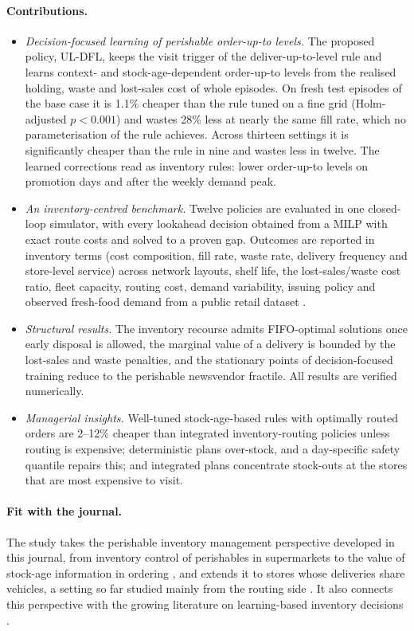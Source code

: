 \documentclass[11pt,a4paper]{article}
\begin{document}
\paragraph{Contributions.}
\begin{itemize}[leftmargin=*]
\item \emph{Decision-focused learning of perishable order-up-to levels.} The proposed policy, UL-DFL, keeps the visit trigger of the deliver-up-to-level rule and learns context- and stock-age-dependent order-up-to levels from the realised holding, waste and lost-sales cost of whole episodes. On fresh test episodes of the base case it is 1.1\% cheaper than the rule tuned on a fine grid (Holm-adjusted $p<0.001$) and wastes 28\% less at nearly the same fill rate, which no parameterisation of the rule achieves. Across thirteen settings it is significantly cheaper than the rule in nine and wastes less in twelve. The learned corrections read as inventory rules: lower order-up-to levels on promotion days and after the weekly demand peak.
\item \emph{An inventory-centred benchmark.} Twelve policies are evaluated in one closed-loop simulator, with every lookahead decision obtained from a MILP with exact route costs and solved to a proven gap. Outcomes are reported in inventory terms (cost composition, fill rate, waste rate, delivery frequency and store-level service) across network layouts, shelf life, the lost-sales/waste cost ratio, fleet capacity, routing cost, demand variability, issuing policy and observed fresh-food demand from a public retail dataset \citep{wang2025freshretailnet}.
\item \emph{Structural results.} The inventory recourse admits FIFO-optimal solutions once early disposal is allowed, the marginal value of a delivery is bounded by the lost-sales and waste penalties, and the stationary points of decision-focused training reduce to the perishable newsvendor fractile. All results are verified numerically.
\item \emph{Managerial insights.} Well-tuned stock-age-based rules with optimally routed orders are 2--12\% cheaper than integrated inventory-routing policies unless routing is expensive; deterministic plans over-stock, and a day-specific safety quantile repairs this; and integrated plans concentrate stock-outs at the stores that are most expensive to visit.
\end{itemize}

\paragraph{Fit with the journal.} The study takes the perishable inventory management perspective developed in this journal, from inventory control of perishables in supermarkets \citep{vandonselaar2006inventory} to the value of stock-age information in ordering \citep{haijema2014new,haijema2019improved}, and extends it to stores whose deliveries share vehicles, a setting so far studied mainly from the routing side \citep{soysal2015modeling}. It also connects this perspective with the growing literature on learning-based inventory decisions \citep{kaynov2024deep}.
\end{document}
